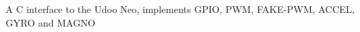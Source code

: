 A C interface to the Udoo Neo, implements G\+P\+IO, P\+WM, F\+A\+K\+E-\/\+P\+WM, A\+C\+C\+EL, G\+Y\+RO and M\+A\+G\+NO 